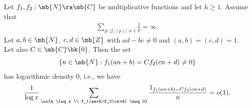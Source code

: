\begin{thm}\label{thm:b0ConcGen}
Let $f_1,f_2: \mb{N} \ra \mb{C}$ be multiplicative functions and let $h \geq 1$. Assume that
%
\begin{align}
\sum_{p: |f_1(p)| \neq 1} \frac{1}{p} = \infty. \label{eq:thinF1}
%
\end{align}
Let $a,b \in \mb{N}$, $c,d \in \mb{Z}$ with $ad-bc \neq 0$ and $(a,b) = (c,d) = 1$. Let also $C \in \mb{C} \bk \{0\}$. 
Then the set
$$
\{n \in \mb{N} : f_1(an+b) = Cf_2(cn+d) \neq 0\}
$$
has logarithmic density $0$, i.e., we have
\begin{equation}\label{eq:logDensZeroGen}
\frac{1}{\log x} \sum_{\ss{n \leq x \\ f_1(an+b)f_2(cn+d) \neq 0}} \frac{1_{f_1(an+b) = Cf_2(cn+d)}}{n} = o(1).
\end{equation}
%
%
%
%
%
%
%
%
\end{thm}
